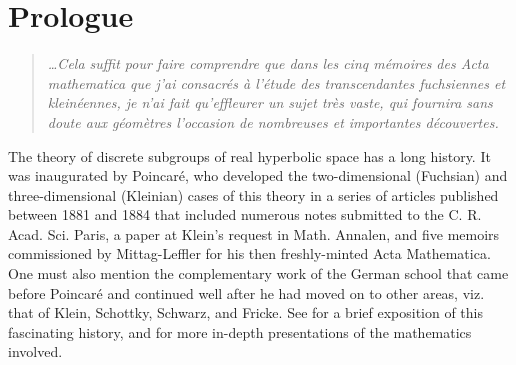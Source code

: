 \chapter*{Prologue}

\bigskip

\begin{quotation}
\emph{\dots Cela suffit pour faire comprendre que dans les cinq m\'emoires des Acta mathematica que j'ai consacr\'es \`a l'\'etude des transcendantes fuchsiennes et klein\'eennes, je n'ai fait qu'effleurer un sujet tr\`es vaste, qui fournira sans doute aux g\'eom\`etres l'occasion de nombreuses et importantes d\'ecouvertes.}
\end{quotation}

\smallskip

The theory of discrete subgroups of real hyperbolic space has a long history. It was inaugurated by Poincar\'e, who developed the two-dimensional (Fuchsian) and three-dimensional (Kleinian) cases of this theory in a series of articles published between 1881 and 1884 that included numerous notes submitted to the C. R. Acad. Sci. Paris,
a paper at Klein's request in Math. Annalen, and five memoirs commissioned by Mittag-Leffler for his then freshly-minted Acta Mathematica. One must also mention the complementary work of the German school that came before Poincar\'e and continued well after he had moved on to other areas, viz. that of Klein, Schottky, Schwarz, and Fricke. See \cite[Chapter 3]{Gray2} for a brief exposition of this fascinating history, and \cite{Gray1, Saint-Gervais} for more in-depth presentations of the mathematics involved.

